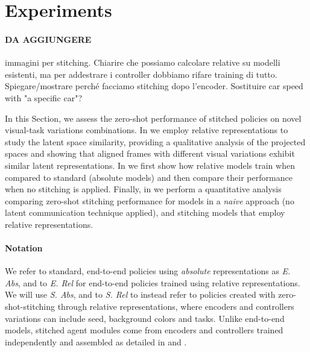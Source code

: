 \section{Experiments}\label{sec:experiments}
\paragraph{DA AGGIUNGERE} immagini per stitching. Chiarire che possiamo calcolare relative su modelli esistenti, ma per addestrare i controller dobbiamo rifare training di tutto.
Spiegare/mostrare perché facciamo stitching dopo l'encoder. Sostituire car speed with "a specific car"?


In this Section, we assess the zero-shot performance of stitched policies on novel visual-task variations combinations.
In  we employ relative representations to study the latent space similarity, providing a qualitative analysis of the projected spaces and showing that aligned frames with different visual variations exhibit similar latent representations.
In  we first show how relative models train when compared to standard (absolute models) and then compare their performance when no stitching is applied.
Finally, in  we perform a quantitative analysis comparing zero-shot stitching performance for models in a \textit{naive} approach (no latent communication technique applied), and stitching models that employ relative representations.

\paragraph{Notation}
We refer to standard, end-to-end policies using \textit{absolute} representations as \emph{E. Abs}, and to \emph{E. Rel} for end-to-end policies trained using relative representations.
We will use \emph{S. Abs}, and to \emph{S. Rel} to instead refer to policies created with zero-shot-stitching through relative representations, where encoders and controllers variations can include seed, background colors and tasks.
Unlike end-to-end models, stitched agent modules come from encoders and controllers trained independently and assembled as detailed in  and .

